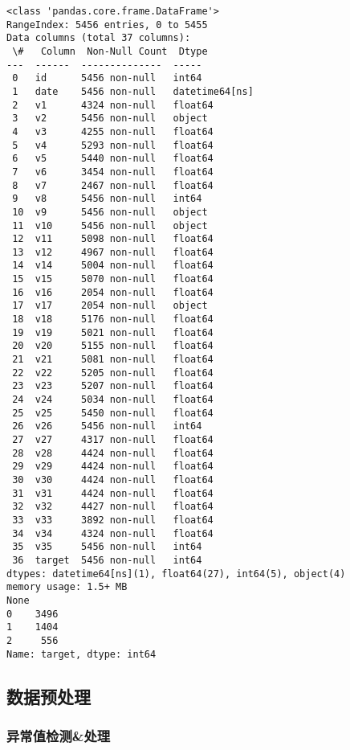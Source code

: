 \documentclass[11pt]{article}
\begin{document}
    \begin{Verbatim}[commandchars=\\\{\}]
<class 'pandas.core.frame.DataFrame'>
RangeIndex: 5456 entries, 0 to 5455
Data columns (total 37 columns):
 \#   Column  Non-Null Count  Dtype         
---  ------  --------------  -----         
 0   id      5456 non-null   int64         
 1   date    5456 non-null   datetime64[ns]
 2   v1      4324 non-null   float64       
 3   v2      5456 non-null   object        
 4   v3      4255 non-null   float64       
 5   v4      5293 non-null   float64       
 6   v5      5440 non-null   float64       
 7   v6      3454 non-null   float64       
 8   v7      2467 non-null   float64       
 9   v8      5456 non-null   int64         
 10  v9      5456 non-null   object        
 11  v10     5456 non-null   object        
 12  v11     5098 non-null   float64       
 13  v12     4967 non-null   float64       
 14  v14     5004 non-null   float64       
 15  v15     5070 non-null   float64       
 16  v16     2054 non-null   float64       
 17  v17     2054 non-null   object        
 18  v18     5176 non-null   float64       
 19  v19     5021 non-null   float64       
 20  v20     5155 non-null   float64       
 21  v21     5081 non-null   float64       
 22  v22     5205 non-null   float64       
 23  v23     5207 non-null   float64       
 24  v24     5034 non-null   float64       
 25  v25     5450 non-null   float64       
 26  v26     5456 non-null   int64         
 27  v27     4317 non-null   float64       
 28  v28     4424 non-null   float64       
 29  v29     4424 non-null   float64       
 30  v30     4424 non-null   float64       
 31  v31     4424 non-null   float64       
 32  v32     4427 non-null   float64       
 33  v33     3892 non-null   float64       
 34  v34     4324 non-null   float64       
 35  v35     5456 non-null   int64         
 36  target  5456 non-null   int64         
dtypes: datetime64[ns](1), float64(27), int64(5), object(4)
memory usage: 1.5+ MB
None
0    3496
1    1404
2     556
Name: target, dtype: int64

    \end{Verbatim}

    \subsection{数据预处理}\label{ux6570ux636eux9884ux5904ux7406}

\subsubsection{异常值检测\&处理}\label{ux5f02ux5e38ux503cux68c0ux6d4bux5904ux7406}
\end{document}
